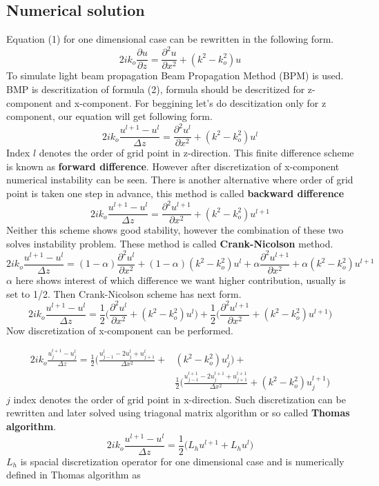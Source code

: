 \documentclass{article}
\begin{document}
	\subsection{Numerical solution}
	Equation (1) for one dimensional case can be rewritten in the following form.
	\begin{equation}
	2ik_o\frac{\partial u}{\partial z}=\frac{\partial^2 u}{\partial x^2}+(k^2-k_o^2)u
	\end{equation}
	To simulate light beam propagation Beam Propagation Method (BPM) is used. BMP is descritization of formula (2), formula should be descritized for z-component and x-component. For beggining let's do descitization only for z component, our equation will get following form.
	\[2ik_o\frac{u^{l+1}-u^l}{\Delta z}=\frac{\partial^2 u^l}{\partial x^2}+(k^2-k_o^2)u^l\]
	Index $l$ denotes the order of grid point in z-direction. This finite difference scheme is known as {\bf forward difference}. However after discretization of x-component numerical instability can be seen. There is another alternative where order of grid point is taken one step in advance, this method is called {\bf backward difference}
	\[2ik_o\frac{u^{l+1}-u^l}{\Delta z}=\frac{\partial^2 u^{l+1}}{\partial x^2}+(k^2-k_o^2)u^{l+1}\]
	Neither this scheme shows good stability, however the combination of these two solves instability problem. These method is called {\bf Crank-Nicolson} method.
	\[2ik_o\frac{u^{l+1}-u^l}{\Delta z}=(1-\alpha)\frac{\partial^2 u^l}{\partial x^2}+(1-\alpha)(k^2-k_o^2)u^l+\alpha \frac{\partial^2 u^{l+1}}{\partial x^2}+\alpha(k^2-k_o^2)u^{l+1}\]
	$\alpha$ here shows interest of which difference we want higher contribution, usually is set to 1/2. Then Crank-Nicolson scheme has next form.
	\[2ik_o\frac{u^{l+1}-u^l}{\Delta z}=\frac{1}{2}\bigg(\frac{\partial^2 u^l}{\partial x^2}+(k^2-k_o^2)u^l\bigg)+\frac{1}{2}\bigg(\frac{\partial^2 u^{l+1}}{\partial x^2}+(k^2-k_o^2)u^{l+1}\bigg)\]
	Now discretization of x-component can be performed.

	\begin{equation*}
	\begin{split}
	2ik_o\frac{u_j^{l+1}-u_j^l}{\Delta z}=\frac{1}{2}\bigg(\frac{u_{j-1}^l-2u_j^l+u_{j+1}^l}{\Delta x^2}+&(k^2-k_o^2)u_j^l\bigg)+\\
	& \frac{1}{2}\bigg(\frac{u_{j-1}^{l+1}-2u_j^{l+1}+u_{j+1}^{l+1}}{\Delta x^2}+(k^2-k_o^2)u_j^{l+1}\bigg)
	\end{split}
	\end{equation*}
	$j$ index denotes the order of grid point in x-direction. Such discretization can be rewritten and later solved using triagonal matrix algorithm or so called {\bf Thomas algorithm}. 
	\[2ik_o\frac{u^{l+1}-u^l}{\Delta z}=\frac{1}{2}\bigg(L_hu^{l+1}+L_hu^l\bigg)\]
	$L_h$ is spacial discretization operator for one dimensional case and is numerically defined in Thomas algorithm as 
\end{document}
